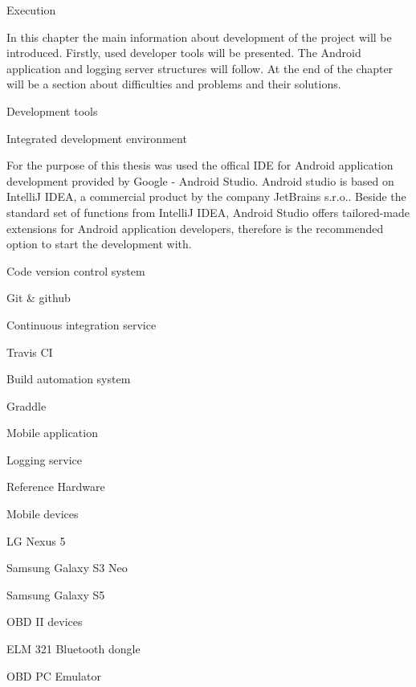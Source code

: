 

\chap Execution

In this chapter the main information about development of the project will be introduced. Firstly, used developer tools will be presented. The Android application and logging server structures will follow. At the end of the chapter will be a section about difficulties and problems and their solutions. 






\sec Development tools



\secc Integrated development environment

For the purpose of this thesis was used the offical IDE for Android application development provided by Google - Android Studio. Android studio is based on IntelliJ IDEA, a commercial product
by the company JetBrains s.r.o.. Beside the standard set of functions from IntelliJ IDEA, Android Studio offers tailored-made extensions for Android application developers, therefore is the recommended option to start the development with. 

\secc Code version control system

Git \& github

\secc Continuous integration service

Travis CI

\secc Build automation system

Graddle


\secc Mobile application

\secc Logging service

\sec Reference Hardware

\secc Mobile devices

\seccc LG Nexus 5

\seccc Samsung Galaxy S3 Neo

\seccc Samsung Galaxy S5

\secc OBD II devices

\seccc ELM 321 Bluetooth dongle 

\seccc OBD PC Emulator
 





